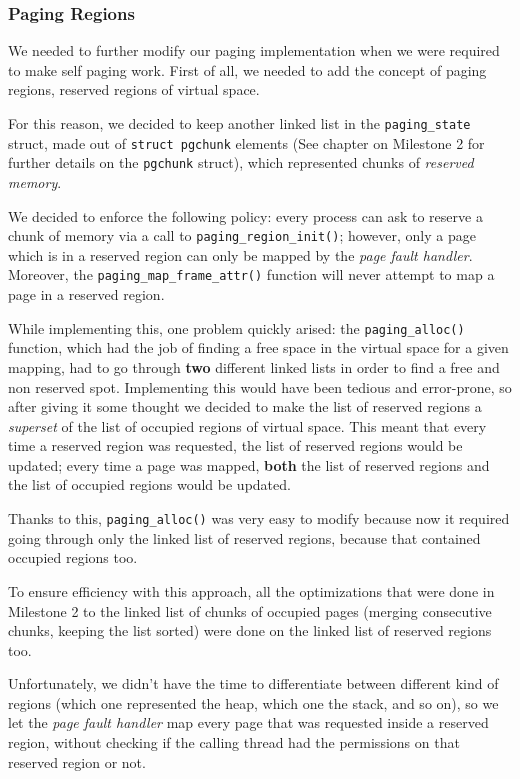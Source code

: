 \documentclass[a4paper,twoside,openright]{report}
\renewcommand{\t}[1]{%
	{\texttt{#1}}}
\begin{document}
\subsubsection{Paging Regions}

We needed to further modify our paging implementation when we were required to
make self paging work. First of all, we needed to add the concept of paging
regions, reserved regions of virtual space. 

For this reason, we decided to keep another linked list in the
\t{paging\_state} struct, made out of \t{struct pgchunk} elements (See chapter
on Milestone 2 for further details on the \t{pgchunk} struct), which
represented chunks of \emph{reserved memory}.

We decided to enforce the following policy: every process can ask to reserve a
chunk of memory via a call to \t{paging\_region\_init()}; however, only a page
which is in a reserved region can only be mapped by the \emph{page fault
handler}. Moreover, the \t{paging\_map\_frame\_attr()} function will never
attempt to map a page in a reserved region.

While implementing this, one problem quickly arised: the \t{paging\_alloc()}
function, which had the job of finding a free space in the virtual space for a
given mapping, had to go through \textbf{two} different linked lists in order
to find a free and non reserved spot. Implementing this would have been tedious
and error-prone, so after giving it some thought we decided to make the list of
reserved regions a \emph{superset} of the list of occupied regions of virtual
space. This meant that every time a reserved region was requested, the list of
reserved regions would be updated; every time a page was mapped, \textbf{both}
the list of reserved regions and the list of occupied regions would be updated.

Thanks to this, \t{paging\_alloc()} was very easy to modify because now it
required going through only the linked list of reserved regions, because that
contained occupied regions too.

To ensure efficiency with this approach, all the optimizations that were done
in Milestone 2 to the linked list of chunks of occupied pages (merging
consecutive chunks, keeping the list sorted) were done on the linked list of
reserved regions too.

Unfortunately, we didn't have the time to differentiate between different kind
of regions (which one represented the heap, which one the stack, and so on), so
we let the \emph{page fault handler} map every page that was requested inside a
reserved region, without checking if the calling thread had the permissions on
that reserved region or not.
\end{document}
